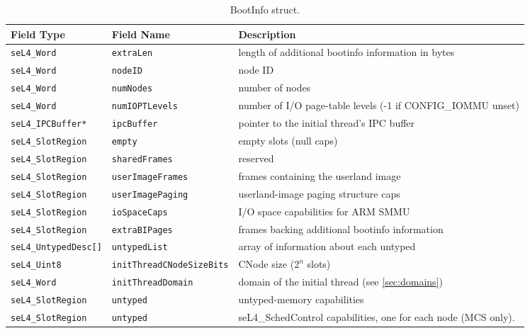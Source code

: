 \begin{table}[htb]
  \begin{center}
    \caption{BootInfo struct.}
    \label{tab:bootinfo_struct}
    \begin{tabularx}{\textwidth}{llX}
      \toprule
      Field Type & Field Name & Description \\
      \midrule
      \texttt{seL4\_Word}           & \texttt{extraLen}                & length of additional bootinfo information in bytes \\
      \texttt{seL4\_Word}           & \texttt{nodeID}                  & node ID \\
      \texttt{seL4\_Word}           & \texttt{numNodes}                & number of nodes \\
      \texttt{seL4\_Word}           & \texttt{numIOPTLevels}           & number of I/O page-table levels (-1 if CONFIG\_IOMMU unset) \\
      \texttt{seL4\_IPCBuffer*}     & \texttt{ipcBuffer}               & pointer to the initial thread's IPC buffer \\
      \texttt{seL4\_SlotRegion}     & \texttt{empty}                   & empty slots (null caps) \\
      \texttt{seL4\_SlotRegion}     & \texttt{sharedFrames}            & reserved \\
      \texttt{seL4\_SlotRegion}     & \texttt{userImageFrames}         & frames containing the userland image \\
      \texttt{seL4\_SlotRegion}     & \texttt{userImagePaging}         & userland-image paging structure caps \\
      \texttt{seL4\_SlotRegion}     & \texttt{ioSpaceCaps}             & I/O space capabilities for ARM SMMU \\
      \texttt{seL4\_SlotRegion}     & \texttt{extraBIPages}            & frames backing additional bootinfo information \\
      \texttt{seL4\_UntypedDesc[]}  & \texttt{untypedList}             & array of information about each untyped \\
      \texttt{seL4\_Uint8}          & \texttt{initThreadCNodeSizeBits} & CNode size ($2^n$ slots) \\
      \texttt{seL4\_Word}           & \texttt{initThreadDomain}        & domain of the initial thread (see \autoref{sec:domains}) \\
      \texttt{seL4\_SlotRegion}     & \texttt{untyped}                 & untyped-memory capabilities \\
      \texttt{seL4\_SlotRegion}   & \texttt{untyped}                 & seL4\_SchedControl capabilities, one for each node (MCS only). \\
      \bottomrule
    \end{tabularx}
  \end{center}
\end{table}


